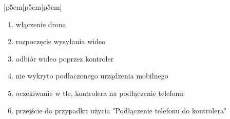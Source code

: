 \documentclass[12pt]{article}
\begin{document}
\begin{table}[H]
\begin{tabular}{|p{5cm}|p{5cm}|p{5cm}|}
{\begin{minipage}[t]{0.6\linewidth}
    \begin{enumerate}
        \item włączenie drona
        \item rozpoczęcie wysyłania wideo
        \item odbiór wideo poprzez kontroler
        \item nie wykryto podłaczonego urządzenia mobilnego
        \item oczekiwanie w tle, kontrolera na podłączenie telefonu
        \item przejście do przypadku użycia "Podłączenie telefonu do kontrolera"
        \newline
    \end{enumerate}
\end{minipage}}
\\
\hline
{}\\
\hline
\end{tabular}
\caption{Przypadki użycia dla przesyłania obrazu na żywo }
\label{tab:tabela_pu}
\end{table}
\end{document}
